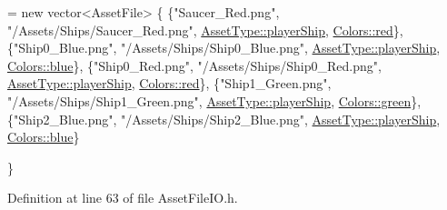 \begin{DoxyCode}
= \textcolor{keyword}{new} vector<AssetFile> \{
    \{\textcolor{stringliteral}{"Saucer\_Red.png"},  \textcolor{stringliteral}{"/Assets/Ships/Saucer\_Red.png"},  \hyperlink{_asset_file_i_o_8h_a72d924d1cb8e1544b6d5198e98d52ca9a4c08b14797b28df331a55e03fff1b2e6}{AssetType::playerShip}, 
      \hyperlink{_character_data_8h_a55ecd4f2ec2ebfe8d5b0163e4ac2a967abda9643ac6601722a28f238714274da4}{Colors::red}\},
    \{\textcolor{stringliteral}{"Ship0\_Blue.png"},  \textcolor{stringliteral}{"/Assets/Ships/Ship0\_Blue.png"},  \hyperlink{_asset_file_i_o_8h_a72d924d1cb8e1544b6d5198e98d52ca9a4c08b14797b28df331a55e03fff1b2e6}{AssetType::playerShip}, 
      \hyperlink{_character_data_8h_a55ecd4f2ec2ebfe8d5b0163e4ac2a967a48d6215903dff56238e52e8891380c8f}{Colors::blue}\},
    \{\textcolor{stringliteral}{"Ship0\_Red.png"},   \textcolor{stringliteral}{"/Assets/Ships/Ship0\_Red.png"},   \hyperlink{_asset_file_i_o_8h_a72d924d1cb8e1544b6d5198e98d52ca9a4c08b14797b28df331a55e03fff1b2e6}{AssetType::playerShip}, 
      \hyperlink{_character_data_8h_a55ecd4f2ec2ebfe8d5b0163e4ac2a967abda9643ac6601722a28f238714274da4}{Colors::red}\},
    \{\textcolor{stringliteral}{"Ship1\_Green.png"}, \textcolor{stringliteral}{"/Assets/Ships/Ship1\_Green.png"}, \hyperlink{_asset_file_i_o_8h_a72d924d1cb8e1544b6d5198e98d52ca9a4c08b14797b28df331a55e03fff1b2e6}{AssetType::playerShip}, 
      \hyperlink{_character_data_8h_a55ecd4f2ec2ebfe8d5b0163e4ac2a967a9f27410725ab8cc8854a2769c7a516b8}{Colors::green}\},
    \{\textcolor{stringliteral}{"Ship2\_Blue.png"},  \textcolor{stringliteral}{"/Assets/Ships/Ship2\_Blue.png"},  \hyperlink{_asset_file_i_o_8h_a72d924d1cb8e1544b6d5198e98d52ca9a4c08b14797b28df331a55e03fff1b2e6}{AssetType::playerShip}, 
      \hyperlink{_character_data_8h_a55ecd4f2ec2ebfe8d5b0163e4ac2a967a48d6215903dff56238e52e8891380c8f}{Colors::blue}\}

\}
\end{DoxyCode}


Definition at line 63 of file Asset\-File\-I\-O.\-h.

